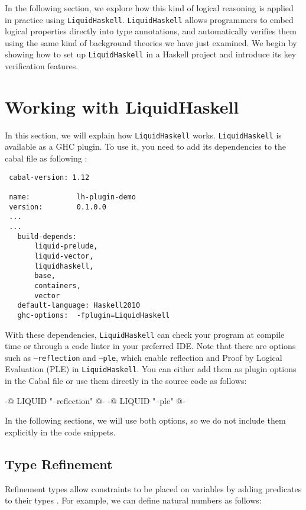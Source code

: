 \documentclass[]{rptuseminar}
\begin{document}
In the following section, we explore how this kind of logical reasoning is applied in practice using \texttt{LiquidHaskell}.
\texttt{LiquidHaskell} allows programmers to embed logical properties directly into type annotations, and automatically verifies them using the same kind of background theories we have just examined. We begin by showing how to set up \texttt{LiquidHaskell} in a Haskell project and introduce its key verification features.
\section{Working with \textbf{LiquidHaskell}}
\label{sec:lh}
In this section, we will explain how \texttt{LiquidHaskell} works.
\texttt{LiquidHaskell} is available as a GHC plugin. To use it, you need to add its dependencies to the cabal file as following \cite{noauthor_ucsd-progsyslh-plugin-demo_2024}:

\vspace{1em}
\begin{lstlisting}
 cabal-version: 1.12

 name:           lh-plugin-demo
 version:        0.1.0.0
 ...
 ...
   build-depends:
       liquid-prelude,
       liquid-vector,
       liquidhaskell,
       base,
       containers,
       vector
   default-language: Haskell2010
   ghc-options:  -fplugin=LiquidHaskell
\end{lstlisting}
\vspace{1em}

With these dependencies, \texttt{LiquidHaskell} can check your program at compile time or through a code linter in your preferred IDE.  
Note that there are options such as \texttt{---reflection} and \texttt{---ple}, which enable reflection and Proof by Logical Evaluation (PLE) in \texttt{LiquidHaskell}.  
You can either add them as plugin options in the Cabal file or use them directly in the source code as follows:  

\begin{haskell}  
{-@ LIQUID "--reflection" @-}  
{-@ LIQUID "--ple" @-}  
\end{haskell}  

In the following sections, we will use both options, so we do not include them explicitly in the code snippets. 

\subsection{Type Refinement}
Refinement types allow constraints to be placed on variables by adding predicates to their types
\cite{jhala_programming_2020}. For example, we can define natural numbers as follows:
\end{document}
